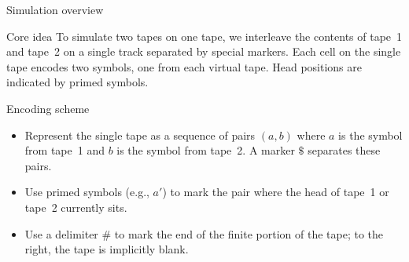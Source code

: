 \begin{frame}[t]{Simulation overview}
  \begin{tblock}{Core idea}
    To simulate two tapes on one tape, we interleave the contents of
    tape 1 and tape 2 on a single track separated by special markers.
    Each cell on the single tape encodes two symbols, one from each
    virtual tape.  Head positions are indicated by primed symbols.
  \end{tblock}
  \begin{tblock}{Encoding scheme}
    \begin{itemize}
      \item Represent the single tape as a sequence of pairs
        $(a,b)$ where $a$ is the symbol from tape 1 and $b$ is the
        symbol from tape 2.  A marker $\$$ separates these pairs.
      \item Use primed symbols (e.g., $a'$) to mark the pair where the
        head of tape 1 or tape 2 currently sits.
      \item Use a delimiter $\#$ to mark the end of the finite portion
        of the tape; to the right, the tape is implicitly blank.
    \end{itemize}
  \end{tblock}
  \label{fr:7.5-04}
\end{frame}

